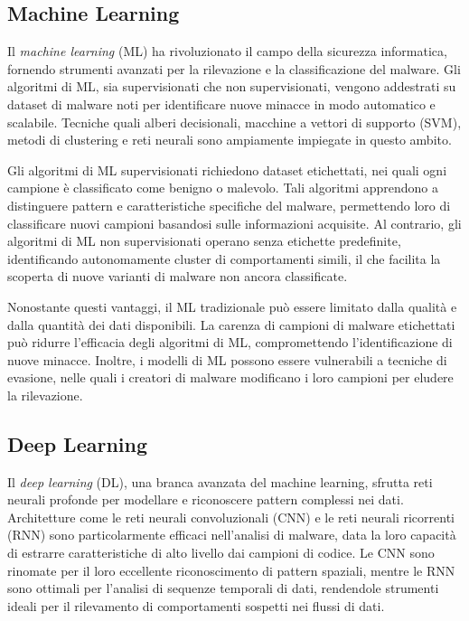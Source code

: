 \subsection{Machine Learning}

Il \emph{machine learning} (ML) ha rivoluzionato il campo della sicurezza informatica, fornendo strumenti avanzati per la rilevazione e la classificazione del malware. Gli algoritmi di ML, sia supervisionati che non supervisionati, vengono addestrati su dataset di malware noti per identificare nuove minacce in modo automatico e scalabile. Tecniche quali alberi decisionali, macchine a vettori di supporto (SVM), metodi di clustering e reti neurali sono ampiamente impiegate in questo ambito.

Gli algoritmi di ML supervisionati richiedono dataset etichettati, nei quali ogni campione è classificato come benigno o malevolo. Tali algoritmi apprendono a distinguere pattern e caratteristiche specifiche del malware, permettendo loro di classificare nuovi campioni basandosi sulle informazioni acquisite. Al contrario, gli algoritmi di ML non supervisionati operano senza etichette predefinite, identificando autonomamente cluster di comportamenti simili, il che facilita la scoperta di nuove varianti di malware non ancora classificate.

Nonostante questi vantaggi, il ML tradizionale può essere limitato dalla qualità e dalla quantità dei dati disponibili. La carenza di campioni di malware etichettati può ridurre l'efficacia degli algoritmi di ML, compromettendo l'identificazione di nuove minacce. Inoltre, i modelli di ML possono essere vulnerabili a tecniche di evasione, nelle quali i creatori di malware modificano i loro campioni per eludere la rilevazione.

\subsection{Deep Learning}

Il \emph{deep learning} (DL), una branca avanzata del machine learning, sfrutta reti neurali profonde per modellare e riconoscere pattern complessi nei dati. Architetture come le reti neurali convoluzionali (CNN) e le reti neurali ricorrenti (RNN) sono particolarmente efficaci nell'analisi di malware, data la loro capacità di estrarre caratteristiche di alto livello dai campioni di codice. Le CNN sono rinomate per il loro eccellente riconoscimento di pattern spaziali, mentre le RNN sono ottimali per l'analisi di sequenze temporali di dati, rendendole strumenti ideali per il rilevamento di comportamenti sospetti nei flussi di dati.

